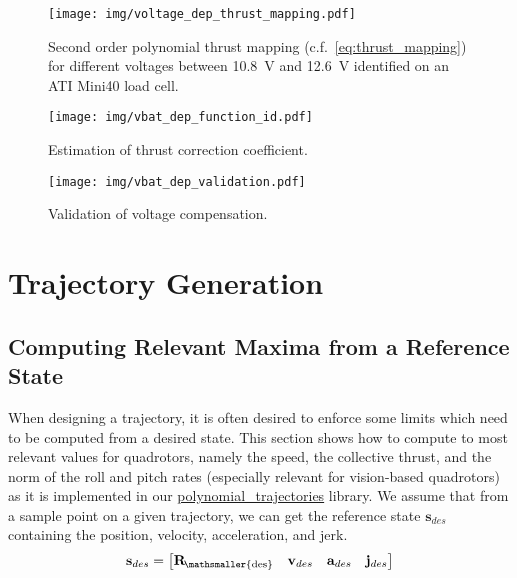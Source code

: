 \documentclass[10pt,a4paper,fleqn]{article}
\newcommand{\bVec}[1]{\mathbf{#1}}
\newcommand{\ori}[1]{\bVec{R}_{\!\mathsmaller{\mathrm{#1}}}} %
\begin{document}
\begin{figure}[]
   \centering
   \texttt{[image: img/voltage\_dep\_thrust\_mapping.pdf]}
   \caption{Second order polynomial thrust mapping (c.f.~\eqref{eq:thrust_mapping}) for different voltages between \SI{10.8}{\volt} and \SI{12.6}{\volt} identified on an ATI Mini40 load cell.}
   \label{fig:volt_dep_thrust_mapping}
\end{figure}

\begin{figure}[]
   \centering
   \texttt{[image: img/vbat\_dep\_function\_id.pdf]}
   \caption{Estimation of thrust correction coefficient.}
   \label{fig:thrust_corr_coeff_est}
\end{figure}

\begin{figure}[]
   \centering
   \texttt{[image: img/vbat\_dep\_validation.pdf]}
   \caption{Validation of voltage compensation.}
   \label{fig:voltage_comp_validation}
\end{figure}

\section{Trajectory Generation}

\subsection{Computing Relevant Maxima from a Reference State}

When designing a trajectory, it is often desired to enforce some limits which need to be computed from a desired state.
This section shows how to compute to most relevant values for quadrotors, namely the speed, the collective thrust, and the norm of the roll and pitch rates (especially relevant for vision-based quadrotors) as it is implemented in our \href{https://github.com/uzh-rpg/rpg_quadrotor_control/tree/master/trajectory_planning/polynomial_trajectories}{polynomial\_trajectories} library.
We assume that from a sample point on a given trajectory, we can get the reference state $\bVec{s}_{des}$ containing the position, velocity, acceleration, and jerk.
%
\begin{equation}
	\bVec{s}_{des} = \begin{bmatrix} \ori{des} & \bVec{v}_{des} & \bVec{a}_{des} & \bVec{j}_{des} \end{bmatrix}
\end{equation}
\end{document}
